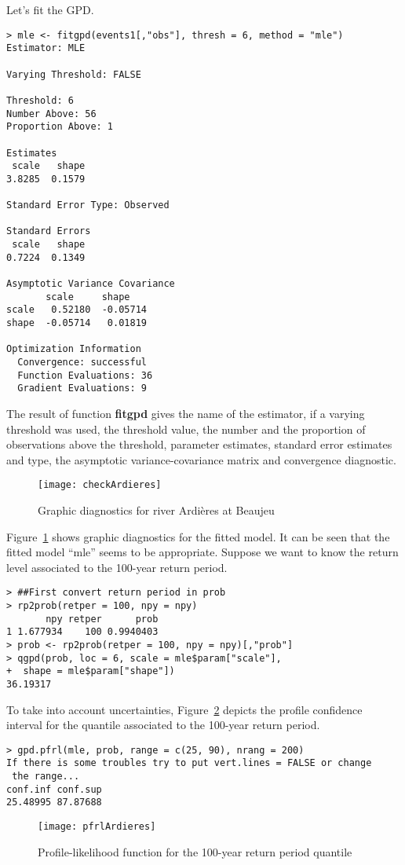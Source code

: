 \documentclass[11pt,a4paper]{article}
\numberwithin{equation}{section}
\begin{document}
Let's fit the GPD.
\begin{verbatim}
> mle <- fitgpd(events1[,"obs"], thresh = 6, method = "mle")
Estimator: MLE 

Varying Threshold: FALSE 

Threshold: 6 
Number Above: 56 
Proportion Above: 1 

Estimates
 scale   shape  
3.8285  0.1579  

Standard Error Type: Observed 

Standard Errors
 scale   shape  
0.7224  0.1349  

Asymptotic Variance Covariance
       scale     shape   
scale   0.52180  -0.05714
shape  -0.05714   0.01819

Optimization Information
  Convergence: successful 
  Function Evaluations: 36 
  Gradient Evaluations: 9 
\end{verbatim}
The result of function \textbf{fitgpd} gives the name of the
estimator, if a varying threshold was used, the threshold value, the
number and the proportion of observations above the threshold,
parameter estimates, standard error estimates and type, the asymptotic
variance-covariance matrix and convergence diagnostic.

\begin{figure}
  \centering
  \texttt{[image: checkArdieres]}
  \caption{Graphic diagnostics for river Ardi\`eres at Beaujeu}
  \label{fig:checkArdieres}
\end{figure}

Figure~\ref{fig:checkArdieres} shows graphic diagnostics for the
fitted model. It can be seen that the fitted model ``mle'' seems to be
appropriate. Suppose we want to know the return level associated to
the 100-year return period.
\begin{verbatim}
> ##First convert return period in prob
> rp2prob(retper = 100, npy = npy)
       npy retper      prob
1 1.677934    100 0.9940403
> prob <- rp2prob(retper = 100, npy = npy)[,"prob"]
> qgpd(prob, loc = 6, scale = mle$param["scale"],
+  shape = mle$param["shape"])
36.19317 
\end{verbatim}


To take into account uncertainties, Figure~\ref{fig:pfrlArdieres}
depicts the profile confidence interval for the quantile associated to
the 100-year return period.
\begin{verbatim}
> gpd.pfrl(mle, prob, range = c(25, 90), nrang = 200)
If there is some troubles try to put vert.lines = FALSE or change
 the range...
conf.inf conf.sup 
25.48995 87.87688 
\end{verbatim}
\begin{figure}
  \centering
  \texttt{[image: pfrlArdieres]}
  \caption{Profile-likelihood function for the 100-year return period
    quantile} 
  \label{fig:pfrlArdieres}
\end{figure}
\end{document}
